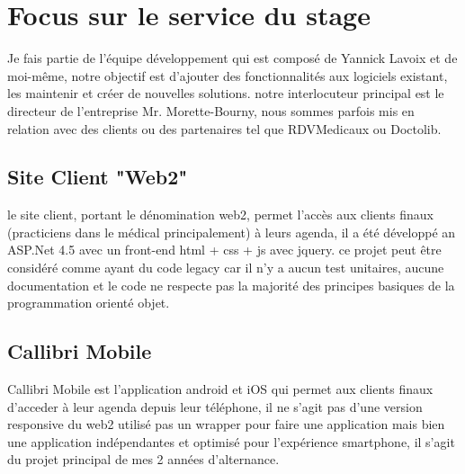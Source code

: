 \section{Focus sur le service du stage}
Je fais partie de l'équipe développement qui est composé de Yannick Lavoix et de moi-même, 
notre objectif est d'ajouter des fonctionnalités aux logiciels existant, 
les maintenir et créer de nouvelles solutions. notre interlocuteur principal est le directeur
de l'entreprise Mr. Morette-Bourny, nous sommes parfois mis en relation avec des clients 
ou des partenaires tel que RDVMedicaux ou Doctolib. \newline

\subsection{Site Client "Web2"}
le site client, portant le dénomination web2, permet l'accès aux 
clients finaux (practiciens dans le médical principalement) à leurs agenda,
il a été développé an ASP.Net 4.5 avec un front-end html + css + js avec jquery.
ce projet peut être considéré comme ayant du code legacy car il n'y a aucun 
test unitaires, aucune documentation et le code ne respecte pas la majorité
des principes basiques de la programmation orienté objet.

\subsection{Callibri Mobile}
Callibri Mobile est l'application android et iOS qui permet aux clients finaux 
d'acceder à leur agenda depuis leur téléphone, il ne s'agit pas d'une version 
responsive du web2 utilisé pas un wrapper pour faire une application mais bien
une application indépendantes et optimisé pour l'expérience smartphone,
il s'agit du projet principal de mes 2 années d'alternance. 


